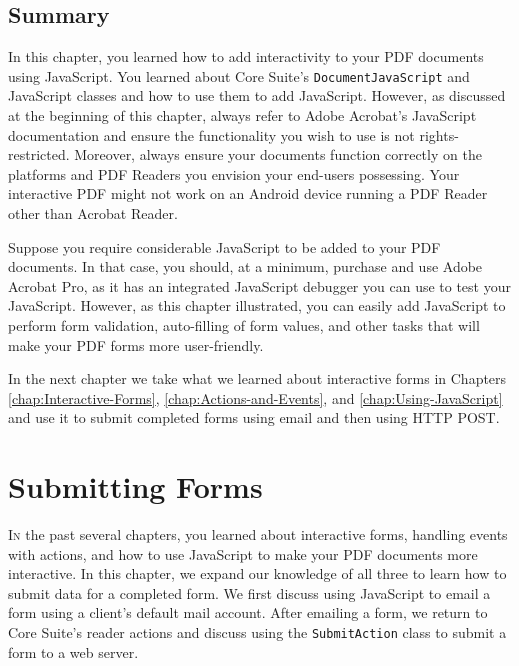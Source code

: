 \documentclass[american]{tufte-book}
\numberwithin{equation}{section}
\numberwithin{figure}{section}
\def\color#1{}%
\begin{document}
{{\begin{figure}
\end{figure}


\section{Summary}

In this chapter, you learned how to add interactivity to your PDF
documents using JavaScript. You learned about Core Suite's \texttt{DocumentJavaScript}
and JavaScript classes and how to use them to add JavaScript. However,
as discussed at the beginning of this chapter, always refer to Adobe
Acrobat's JavaScript documentation and ensure the functionality you
wish to use is not rights-restricted. Moreover, always ensure your
documents function correctly on the platforms and PDF Readers you
envision your end-users possessing. Your interactive PDF might not
work on an Android device running a PDF Reader other than Acrobat
Reader. 

Suppose you require considerable JavaScript to be added to your PDF
documents. In that case, you should, at a minimum, purchase and use
Adobe Acrobat Pro, as it has an integrated JavaScript debugger you
can use to test your JavaScript. However, as this chapter illustrated,
you can easily add JavaScript to perform form validation, auto-filling
of form values, and other tasks that will make your PDF forms more
user-friendly.

In the next chapter we take what we learned about interactive forms
in Chapters \ref{chap:Interactive-Forms}, \ref{chap:Actions-and-Events},
and \ref{chap:Using-JavaScript} and use it to submit completed forms
using email and then using HTTP POST.

\color{white}
\chapter{Submitting Forms}\label{chap:Submitting-Forms}
\color{black}
\BgThispage
\vspace{8.00em}
\lettrine[lines=2,lhang=0.1]{I}{n} the past several chapters, you learned about interactive forms,
handling events with actions, and how to use JavaScript to make your
PDF documents more interactive. In this chapter, we expand our knowledge
of all three to learn how to submit data for a completed form. We
first discuss using JavaScript to email a form using a client's default
mail account. After emailing a form, we return to Core Suite's reader
actions and discuss using the \texttt{SubmitAction} class to submit
a form to a web server. 

}}
\end{document}
